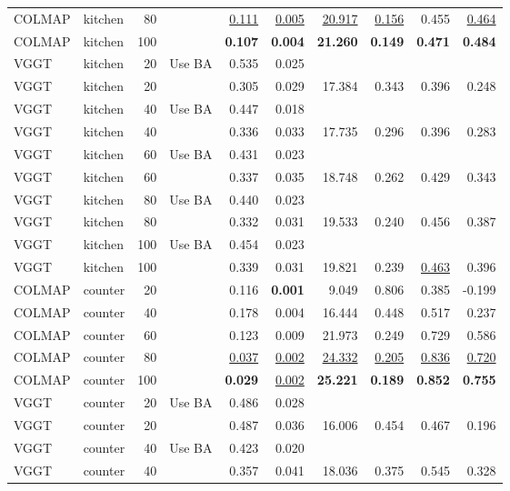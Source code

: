 \begin{table}[H]
\begin{tabular}{llrlrrrrrr}
COLMAP & kitchen & 80 &  & \underline{0.111} & \underline{0.005} & \underline{20.917} & \underline{0.156} & 0.455 & \underline{0.464} \\
COLMAP & kitchen & 100 &  & \textbf{0.107} & \textbf{0.004} & \textbf{21.260} & \textbf{0.149} & \textbf{0.471} & \textbf{0.484} \\
VGGT & kitchen & 20 & Use BA & 0.535 & 0.025 &  &  &  &  \\
VGGT & kitchen & 20 &  & 0.305 & 0.029 & 17.384 & 0.343 & 0.396 & 0.248 \\
VGGT & kitchen & 40 & Use BA & 0.447 & 0.018 &  &  &  &  \\
VGGT & kitchen & 40 &  & 0.336 & 0.033 & 17.735 & 0.296 & 0.396 & 0.283 \\
VGGT & kitchen & 60 & Use BA & 0.431 & 0.023 &  &  &  &  \\
VGGT & kitchen & 60 &  & 0.337 & 0.035 & 18.748 & 0.262 & 0.429 & 0.343 \\
VGGT & kitchen & 80 & Use BA & 0.440 & 0.023 &  &  &  &  \\
VGGT & kitchen & 80 &  & 0.332 & 0.031 & 19.533 & 0.240 & 0.456 & 0.387 \\
VGGT & kitchen & 100 & Use BA & 0.454 & 0.023 &  &  &  &  \\
VGGT & kitchen & 100 &  & 0.339 & 0.031 & 19.821 & 0.239 & \underline{0.463} & 0.396 \\
\midrule
COLMAP & counter & 20 &  & 0.116 & \textbf{0.001} & 9.049 & 0.806 & 0.385 & -0.199 \\
COLMAP & counter & 40 &  & 0.178 & 0.004 & 16.444 & 0.448 & 0.517 & 0.237 \\
COLMAP & counter & 60 &  & 0.123 & 0.009 & 21.973 & 0.249 & 0.729 & 0.586 \\
COLMAP & counter & 80 &  & \underline{0.037} & \underline{0.002} & \underline{24.332} & \underline{0.205} & \underline{0.836} & \underline{0.720} \\
COLMAP & counter & 100 &  & \textbf{0.029} & \underline{0.002} & \textbf{25.221} & \textbf{0.189} & \textbf{0.852} & \textbf{0.755} \\
VGGT & counter & 20 & Use BA & 0.486 & 0.028 &  &  &  &  \\
VGGT & counter & 20 &  & 0.487 & 0.036 & 16.006 & 0.454 & 0.467 & 0.196 \\
VGGT & counter & 40 & Use BA & 0.423 & 0.020 &  &  &  &  \\
VGGT & counter & 40 &  & 0.357 & 0.041 & 18.036 & 0.375 & 0.545 & 0.328 \\

\end{tabular}
\end{table}
